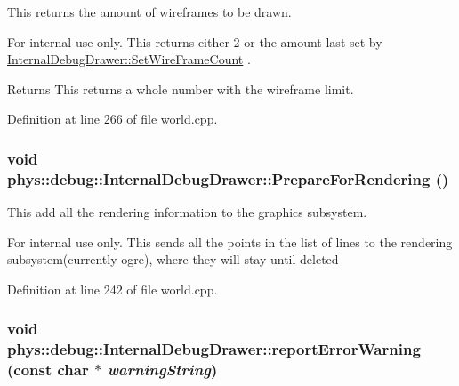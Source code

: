 This returns the amount of wireframes to be drawn. 

\begin{DoxyInternal}{For internal use only.}
This returns either 2 or the amount last set by \hyperlink{classphys_1_1debug_1_1InternalDebugDrawer_a76922fda7bb3b59d301e50d67e4f3c72}{InternalDebugDrawer::SetWireFrameCount} . \begin{DoxyReturn}{Returns}
This returns a whole number with the wireframe limit. 
\end{DoxyReturn}
\end{DoxyInternal}


Definition at line 266 of file world.cpp.

\hypertarget{classphys_1_1debug_1_1InternalDebugDrawer_a1002293d223ca20e5bccc3c3412ce262}{
\subsubsection[{PrepareForRendering}]{\setlength{\rightskip}{0pt plus 5cm}void phys::debug::InternalDebugDrawer::PrepareForRendering ()}}
\label{db/d27/classphys_1_1debug_1_1InternalDebugDrawer_a1002293d223ca20e5bccc3c3412ce262}


This add all the rendering information to the graphics subsystem. 

\begin{DoxyInternal}{For internal use only.}
This sends all the points in the list of lines to the rendering subsystem(currently ogre), where they will stay until deleted \end{DoxyInternal}


Definition at line 242 of file world.cpp.

\hypertarget{classphys_1_1debug_1_1InternalDebugDrawer_a4e3b4cbc861f76696b4d32f0cf068ea6}{
\subsubsection[{reportErrorWarning}]{\setlength{\rightskip}{0pt plus 5cm}void phys::debug::InternalDebugDrawer::reportErrorWarning (const char $\ast$ {\em warningString})}}
\label{db/d27/classphys_1_1debug_1_1InternalDebugDrawer_a4e3b4cbc861f76696b4d32f0cf068ea6}


